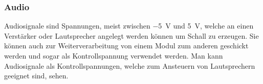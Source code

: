 \subsubsection{Audio}
\label{sec:org30b263a}
Audiosignale sind Spannungen, meist zwischen \SI{-5}{\volt} und \SI{5}{\volt}, welche an einen Verstärker oder Lautsprecher angelegt werden können um Schall zu erzeugen. Sie können auch zur Weiterverarbeitung von einem Modul zum anderen geschickt werden und sogar als Kontrollspannung verwendet werden. Man kann Audiosignale als Kontrollspannungen, welche zum Ansteuern von Lautsprechern geeignet sind, sehen.
